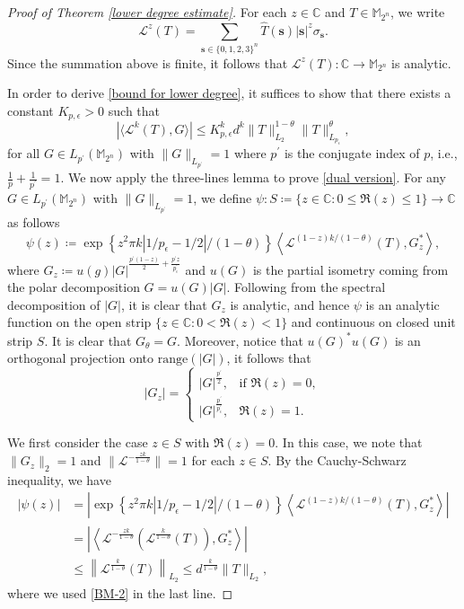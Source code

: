 \documentclass{amsbook}
\theoremstyle{definition}
\theoremstyle{remark}
\numberwithin{section}{chapter}
\numberwithin{equation}{chapter}
\newcommand{\M}{\mathbb{M}}
\newcommand{\1}{\mathbf{1}}
\newcommand{\s}{\mathbf{s}}
\begin{document}
\begin{proof}[Proof of Theorem \ref{lower degree estimate}]
For each $z\in\mathbb{C}$ and $T\in \M_{2^{n}}$, we write
\[
\mathcal{L}^{z}(T)=\sum_{\s\in \{0,1,2,3\}^{n}}\widehat{T}(\s)|\s|^{z}\sigma_{\s}.
\]
Since the summation above is finite, it follows that $\mathcal{L}^{z}(T):\mathbb{C}\to \M_{2^{n}}$ is analytic.

In order to derive \eqref{bound for lower degree}, it suffices to show that there exists a constant $K_{p,\epsilon}>0$ such that
\begin{equation}\label{dual version}
\left|\langle \mathcal{L}^{k}(T),G \rangle\right|\leq K_{p,\epsilon}^{k}d^{k}\|T\|^{1-\theta}_{L_2}\|T\|^{\theta}_{L_{p_{\epsilon}}},
\end{equation}
for all $G\in L_{p^{\prime}}(\M_{2^{n}})$ with $\|G\|_{L_{p^{\prime}}}=1$ where $p^{\prime}$ is the conjugate index of $p$, i.e., $\frac{1}{p}+\frac{1}{p^{\prime}}=1$. We now apply the three-lines lemma to prove \eqref{dual version}. For any $G\in L_{p^{\prime}}(\M_{2^{n}})$ with $\|G\|_{L_{p^{\prime}}}=1$, we define $\psi:S\coloneqq\{z\in \mathbb{C}:0\leq \Re(z)\leq 1\}\to \mathbb{C}$ as follows
\[
\psi(z)\coloneqq \exp\left\{z^{2}\pi k|1/p_{\epsilon}-1/2|/(1-\theta)\right\}\left\langle \mathcal{L}^{(1-z)k/(1-\theta)}(T),G^{*}_{z}\right\rangle,
\]
where $G_{z}\coloneqq u(g)|G|^{\frac{p^{\prime}(1-z)}{2}+\frac{p^{\prime}z}{p_{\epsilon}^{\prime}}}$ and $u(G)$ is the partial isometry coming from the polar decomposition $G=u(G)|G|$. Following from the spectral decomposition of $|G|$, it is clear that $G_{z}$ is analytic, and hence $\psi$ is an analytic function on the open strip $\{z\in \mathbb{C}:0<\Re(z)<1\}$ and continuous on closed unit strip $S$. It is clear that $G_{\theta}=G$. Moreover, notice that $u(G)^*u(G)$ is an orthogonal projection onto $\mathrm{range}(|G|)$, it follows that
\begin{equation}
|G_{z}|=
\begin{cases}
|G|^{\frac{p^{\prime}}{2}},& \mbox{if }\Re(z)=0,\\
|G|^{\frac{p^{\prime}}{p_{\epsilon}^{\prime}}},& \Re(z)=1.
\end{cases}
\end{equation}

We first consider the case $z\in S$ with $\Re(z)=0$. In this case, we note that $\|G_z\|_{2}=1$ and $\|\mathcal{L}^{-\frac{zk}{1-\theta}}\|=1$ for each  $z\in S$. By the Cauchy-Schwarz inequality, we have
\begin{equation}\label{imaginary part}
\begin{split}
|\psi(z)|&=\left|\exp\left\{z^{2}\pi k|1/p_{\epsilon}-1/2|/(1-\theta)\right\}\left\langle \mathcal{L}^{(1-z)k/(1-\theta)}(T),G^{*}_{z}\right\rangle\right|\\
&=\left|\left\langle \mathcal{L}^{-\frac{zk}{1-\theta}}\left(\mathcal{L}^{\frac{k}{1-\theta}}(T)\right),G^{*}_{z}\right\rangle\right|\\
&\leq\left\| \mathcal{L}^{\frac{k}{1-\theta}}(T)\right\|_{L_2}\leq d^{\frac{k}{1-\theta}}\|T\|_{L_2},
\end{split}
\end{equation}
where we used \eqref{BM-2} in the last line.


\end{proof}
\end{document}
